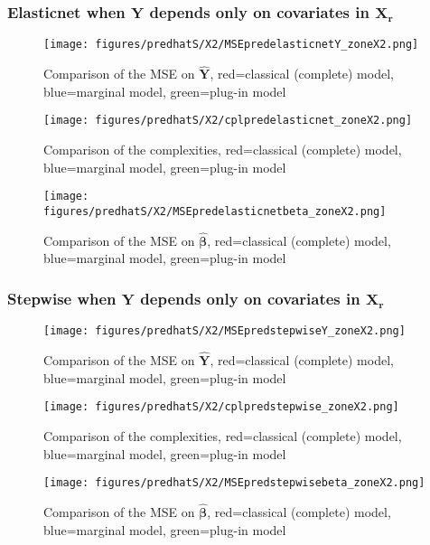 \documentclass[12pt,a4paper]{report}
\begin{document}
\subsubsection{Elasticnet when $\boldsymbol{Y}$ depends only on covariates in $\boldsymbol{X_r}$}

	\begin{figure}[h!]
	\centering
		  \texttt{[image: figures/predhatS/X2/MSEpredelasticnetY\_zoneX2.png]}
		\caption{Comparison of the MSE on $\hat{\boldsymbol{Y}}$, red=classical (complete) model, blue=marginal model, green=plug-in model}\label{MSEpredelasticnetY_zoneX2}
	\end{figure}
	\begin{figure}[h!]
	\centering
		  \texttt{[image: figures/predhatS/X2/cplpredelasticnet\_zoneX2.png]}
		\caption{Comparison of the complexities, red=classical (complete) model, blue=marginal model, green=plug-in model}\label{cplpredelasticnet_zoneX2}
	\end{figure}
	\begin{figure}[h!]
	\centering
		  \texttt{[image: figures/predhatS/X2/MSEpredelasticnetbeta\_zoneX2.png]}
		\caption{Comparison of the MSE on $\hat{\boldsymbol{\beta}}$, red=classical (complete) model, blue=marginal model, green=plug-in model}\label{MSEpredelasticnetbeta_zoneX2}
	\end{figure}
	\FloatBarrier
\newpage
\subsubsection{Stepwise when $\boldsymbol{Y}$ depends only on covariates in $\boldsymbol{X_r}$}

	\begin{figure}[h!]
	\centering
		  \texttt{[image: figures/predhatS/X2/MSEpredstepwiseY\_zoneX2.png]}
		\caption{Comparison of the MSE on $\hat{\boldsymbol{Y}}$, red=classical (complete) model, blue=marginal model, green=plug-in model}\label{MSEpredstepwiseY_zoneX2}
	\end{figure}
	\begin{figure}[h!]
	\centering
		  \texttt{[image: figures/predhatS/X2/cplpredstepwise\_zoneX2.png]}
		\caption{Comparison of the complexities, red=classical (complete) model, blue=marginal model, green=plug-in model}\label{cplpredstepwise_zoneX2}
	\end{figure}
	\begin{figure}[h!]
	\centering
		  \texttt{[image: figures/predhatS/X2/MSEpredstepwisebeta\_zoneX2.png]}
		\caption{Comparison of the MSE on $\hat{\boldsymbol{\beta}}$, red=classical (complete) model, blue=marginal model, green=plug-in model}\label{MSEpredstepwisebeta_zoneX2}
	\end{figure}
	\FloatBarrier
\newpage
\end{document}
